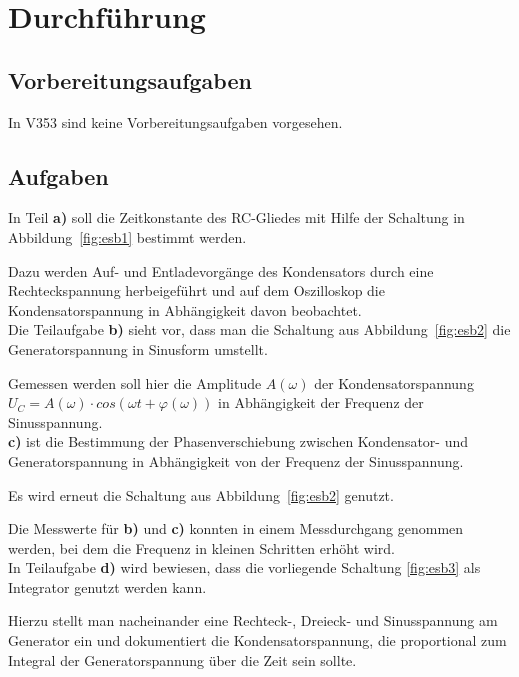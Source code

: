 \section{Durchführung}
\label{sec:Durchfuehrung}

\subsection{Vorbereitungsaufgaben}

In V353 sind keine Vorbereitungsaufgaben vorgesehen.



\subsection{Aufgaben}
\label{subsec:Aufgaben}

In Teil \textbf{a)} soll die Zeitkonstante des RC-Gliedes mit Hilfe der Schaltung in
Abbildung~\ref{fig:esb1} bestimmt werden.

Dazu werden Auf- und Entladevorgänge des Kondensators 
durch eine Rechteckspannung herbeigeführt und auf dem Oszilloskop die Kondensatorspannung in 
Abhängigkeit davon beobachtet. \\

Die Teilaufgabe \textbf{b)} sieht vor, dass man die Schaltung aus Abbildung~\ref{fig:esb2} die Generatorspannung in Sinusform umstellt.

Gemessen werden soll hier die Amplitude $A(\omega)$ der Kondensatorspannung
 $U_C = A(\omega) \cdot cos(\omega t + \varphi(\omega))$ in Abhängigkeit der Frequenz
der Sinusspannung.\\

\textbf{c)} ist die Bestimmung der Phasenverschiebung zwischen Kondensator- und 
Generatorspannung in Abhängigkeit von der Frequenz der Sinusspannung. 

Es wird erneut die Schaltung aus Abbildung~\ref{fig:esb2} genutzt.

Die Messwerte für \textbf{b)} und \textbf{c)} konnten in einem 
Messdurchgang genommen werden, bei dem die Frequenz in kleinen Schritten erhöht wird. \\

In Teilaufgabe \textbf{d)} wird bewiesen, dass die vorliegende Schaltung \ref{fig:esb3} als Integrator genutzt werden kann.

Hierzu stellt man nacheinander eine Rechteck-, Dreieck- und Sinusspannung am Generator ein und dokumentiert 
die Kondensatorspannung, die proportional zum Integral der Generatorspannung über die Zeit sein sollte. \\



